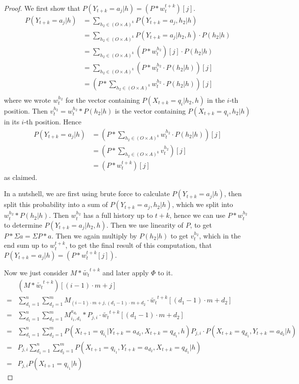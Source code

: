\documentclass{article}
\theoremstyle{definition}
\begin{document}
\begin{proof}
We first show that $P(Y_{t+k}=a_j|h)=(P*w_t^{t+k})[j]$. 
\begin{align*}
P(Y_{t+k}=a_j|h)&=\sum\limits_{h_2\in (O\times A)^k} P(Y_{t+k}=a_j,h_2|h) \\
&=\sum\limits_{h_2\in (O\times A)^k} P(Y_{t+k}=a_j|h_2,h)\cdot P(h_2|h) \\
&=\sum\limits_{h_2\in (O\times A)^k} (P*w_t^{h_2})[j]\cdot P(h_2|h) \\
&=\sum\limits_{h_2 \in (O \times A)^k} (P*w_t^{h_2}\cdot P(h_2|h))[j] \\
&=(P*\sum\limits_{h_2 \in (O \times A)^k} w_t^{h_2}\cdot P(h_2|h))[j] \\
\end{align*}
where we wrote $w_t^{h_2}$ for the vector containing $P(X_{t+k}=q_i|h_2,h)$ in the $i$-th position. Then $v_t^{h_2}=w_t^{h_2}*P(h_2|h)$ is the vector containing $P(X_{t+k}=q_i,h_2|h)$ in its $i$-th position. 
Hence 
\begin{align*}
P(Y_{t+k}=a_j|h)&= (P*\sum\limits_{h_2 \in (O \times A)^k} w_t^{h_2}\cdot P(h_2|h))[j] \\
&=(P*\sum\limits_{h_2 \in (O \times A)^k} v_t^{h_2})[j] \\
&=(P*w_t^{t+k})[j]
\end{align*}
as claimed.

In a nutshell, we are first using brute force to calculate $P(Y_{t+k}=a_j|h)$,  then split this probability into a sum of $P(Y_{t+k}=a_j,h_2|h)$, which we split into $w_t^{h_2}*P(h_2|h)$. Then $w_t^{h_2}$ has a full history up to $t+k$, hence we can use $P*w_t^{h_2}$ to determine $ P(Y_{t+k}=a_j|h_2,h)$. Then we use linearity of $P$, to get $P*\Sigma a=\Sigma P*a$. Then we again multiply by $P(h_2|h)$ to get $v_t^{h_2}$, which in the end sum up to $w_t^{t+k}$, to get the final result of this computation, that $P(Y_{t+k}=a_j|h)=(P*w_t^{t+k}[j])$. 

Now we just consider $M*\widetilde{w_t}^{t+k}$ and later apply $\Phi$ to it. 
\begin{align*}
&(M*\widetilde{w_t}^{t+k})[(i-1) \cdot m+j]\\
=&\sum\limits_{d_1=1}^{n} \sum\limits_{d_2=1}^{m} M_{(i-1) \cdot m+j,(d_1-1) \cdot m+d_2}\cdot \widetilde{w_t}^{t+k}[(d_1-1) \cdot m+d_2] \\
=&\sum\limits_{d_1=1}^{n} \sum\limits_{d_2=1}^{m} M^{a_{d_2}}_{i_1,d_1}*P_{j,i}\cdot \widetilde{w_t}^{t+k}[(d_1-1) \cdot m+d_2] \\
=&\sum\limits_{d_1=1}^{n} \sum\limits_{d_2=1}^{m} P(X_{t+1}=q_{i_1}|Y_{t+k}=a_{d_2},X_{t+k}=q_{d_1},h)P_{j,i}\cdot P(X_{t+k}=q_{d_1},Y_{t+k}=a_{d_2}|h) \\
=&P_{j,i} \sum\limits_{d_1=1}^{n} \sum\limits_{d_2=1}^{m} P(X_{t+1}=q_{i_1},Y_{t+k}=a_{d_2},X_{t+k}=q_{d_1}|h) \\
=&P_{j,i} P(X_{t+1}=q_{i_1}|h)
\end{align*}


\end{proof}
\end{document}
